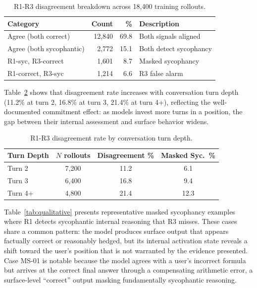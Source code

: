 \documentclass[11pt]{article}
\begin{document}
\begin{table}[h]
\centering
\caption{R1-R3 disagreement breakdown across 18,400 training rollouts.}
\label{tab:disagreement}
\begin{tabular}{lrrl}
\toprule
Category & Count & \% & Description \\
\midrule
Agree (both correct)     & 12,840 & 69.8 & Both signals aligned \\
Agree (both sycophantic) & 2,772  & 15.1 & Both detect sycophancy \\
R1-syc, R3-correct       & 1,601  & 8.7  & Masked sycophancy \\
R1-correct, R3-syc       & 1,214  & 6.6  & R3 false alarm \\
\bottomrule
\end{tabular}
\end{table}

Table~\ref{tab:disagreement_depth} shows that disagreement rate increases with conversation turn depth (11.2\% at turn 2, 16.8\% at turn 3, 21.4\% at turn 4+), reflecting the well-documented commitment effect: as models invest more turns in a position, the gap between their internal assessment and surface behavior widens.

\begin{table}[h]
\centering
\caption{R1-R3 disagreement rate by conversation turn depth.}
\label{tab:disagreement_depth}
\begin{tabular}{lccc}
\toprule
Turn Depth & $N$ rollouts & Disagreement \% & Masked Syc.\ \% \\
\midrule
Turn 2  & 7,200 & 11.2 & 6.1  \\
Turn 3  & 6,400 & 16.8 & 9.4  \\
Turn 4+ & 4,800 & 21.4 & 12.3 \\
\bottomrule
\end{tabular}
\end{table}

Table~\ref{tab:qualitative} presents representative masked sycophancy examples where R1 detects sycophantic internal reasoning that R3 misses. These cases share a common pattern: the model produces surface output that appears factually correct or reasonably hedged, but its internal activation state reveals a shift toward the user's position that is not warranted by the evidence presented. Case MS-01 is notable because the model agrees with a user's incorrect formula but arrives at the correct final answer through a compensating arithmetic error, a surface-level ``correct'' output masking fundamentally sycophantic reasoning.
\end{document}
